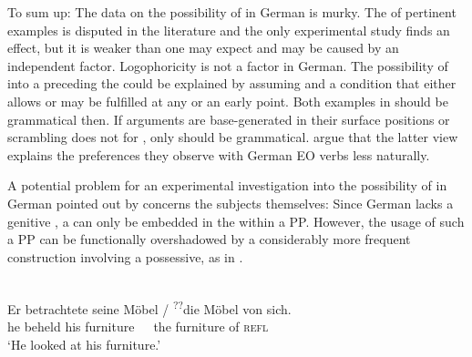 \documentclass[output=paper,colorlinks,citecolor=brown]{langscibook}
\begin{document}
To sum up: The data on the possibility of  in German is murky. 
The  of pertinent examples is disputed in the literature and the only experimental study finds an effect, but it is weaker than one may expect and may be caused by an independent factor.
Logophoricity is not a factor in German.
The possibility of  into a  preceding the  could be explained by assuming  and a  condition that either allows  or may be fulfilled at any or an early point.
Both examples in  should be grammatical then.
If arguments are base-generated in their surface positions or scrambling does not  for , only  should be grammatical.
\textcite{masloch_not_2024} argue that the latter view explains the  preferences they observe with German EO verbs less naturally.

A potential problem for an experimental investigation into the possibility of   in German pointed out by \citet[286]{temme_backward_2017} concerns the subjects themselves:
Since German lacks a genitive , a  can only be embedded in the  within a PP.
However, the usage of such a PP can be functionally overshadowed by a considerably more frequent construction involving a possessive, as in . 

\ea \parencite[based on an in-text example by][286]{temme_backward_2017} \label{ex:possessive:Masloch}\\
\gll Er betrachtete seine Möbel / \textsuperscript{??}die Möbel von sich.\\
     he beheld    his   furniture {} ~~\,the furniture of \textsc{refl}\\
\glt `He looked at his furniture.'
\z
\end{document}
